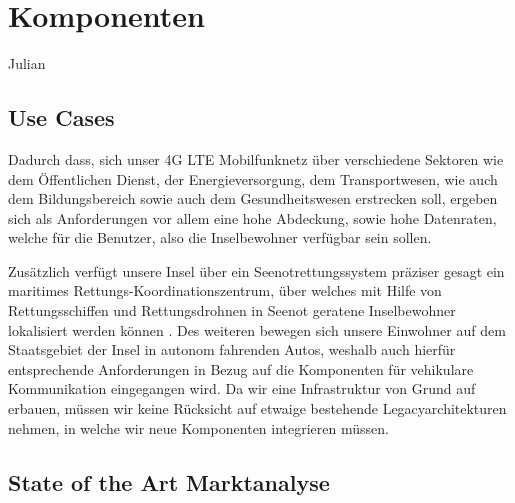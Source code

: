 
%
%
% 
% 
% 


\section{Komponenten}
\label{sec:Komponenten}
	Julian
	\subsection{Use Cases}
	\label{subsec:Use Cases}
	
	Dadurch dass, sich unser 4G LTE Mobilfunknetz über verschiedene Sektoren wie dem Öffentlichen Dienst, der Energieversorgung, dem Transportwesen, wie auch dem Bildungsbereich\cite{Tch18} sowie auch dem Gesundheitswesen erstrecken soll, ergeben sich als Anforderungen vor allem eine hohe Abdeckung, sowie hohe Datenraten, welche für die Benutzer, also die Inselbewohner verfügbar sein sollen. 
	
	Zusätzlich verfügt unsere Insel über ein Seenotrettungssystem präziser gesagt ein maritimes Rettungs-Koordinationszentrum, über welches mit Hilfe von Rettungsschiffen und Rettungsdrohnen in Seenot geratene Inselbewohner lokalisiert werden können \cite{Eck18}. Des weiteren bewegen sich unsere Einwohner auf dem Staatsgebiet der Insel in autonom fahrenden Autos, weshalb auch hierfür entsprechende Anforderungen in Bezug auf die Komponenten für vehikulare Kommunikation eingegangen wird. Da wir eine Infrastruktur von Grund auf erbauen, müssen wir keine Rücksicht auf etwaige bestehende Legacyarchitekturen nehmen, in welche wir neue Komponenten integrieren müssen. 
	\subsection{State of the Art Marktanalyse}
	\label{subsec:Marktanalyse}
	
